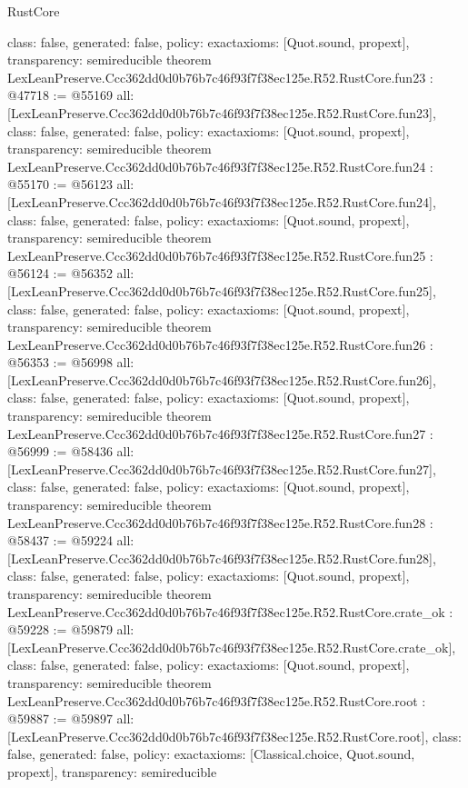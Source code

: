 \begin{lexlean}{RustCore}
\begin{coremodule}
{  class: false,
  generated: false,
  policy: exact{axioms: [Quot.sound, propext]},
  transparency: semireducible
}
theorem LexLeanPreserve.Ccc362dd0d0b76b7c46f93f7f38ec125e.R52.RustCore.fun23 : @47718 := @55169 {
  all: [LexLeanPreserve.Ccc362dd0d0b76b7c46f93f7f38ec125e.R52.RustCore.fun23],
  class: false,
  generated: false,
  policy: exact{axioms: [Quot.sound, propext]},
  transparency: semireducible
}
theorem LexLeanPreserve.Ccc362dd0d0b76b7c46f93f7f38ec125e.R52.RustCore.fun24 : @55170 := @56123 {
  all: [LexLeanPreserve.Ccc362dd0d0b76b7c46f93f7f38ec125e.R52.RustCore.fun24],
  class: false,
  generated: false,
  policy: exact{axioms: [Quot.sound, propext]},
  transparency: semireducible
}
theorem LexLeanPreserve.Ccc362dd0d0b76b7c46f93f7f38ec125e.R52.RustCore.fun25 : @56124 := @56352 {
  all: [LexLeanPreserve.Ccc362dd0d0b76b7c46f93f7f38ec125e.R52.RustCore.fun25],
  class: false,
  generated: false,
  policy: exact{axioms: [Quot.sound, propext]},
  transparency: semireducible
}
theorem LexLeanPreserve.Ccc362dd0d0b76b7c46f93f7f38ec125e.R52.RustCore.fun26 : @56353 := @56998 {
  all: [LexLeanPreserve.Ccc362dd0d0b76b7c46f93f7f38ec125e.R52.RustCore.fun26],
  class: false,
  generated: false,
  policy: exact{axioms: [Quot.sound, propext]},
  transparency: semireducible
}
theorem LexLeanPreserve.Ccc362dd0d0b76b7c46f93f7f38ec125e.R52.RustCore.fun27 : @56999 := @58436 {
  all: [LexLeanPreserve.Ccc362dd0d0b76b7c46f93f7f38ec125e.R52.RustCore.fun27],
  class: false,
  generated: false,
  policy: exact{axioms: [Quot.sound, propext]},
  transparency: semireducible
}
theorem LexLeanPreserve.Ccc362dd0d0b76b7c46f93f7f38ec125e.R52.RustCore.fun28 : @58437 := @59224 {
  all: [LexLeanPreserve.Ccc362dd0d0b76b7c46f93f7f38ec125e.R52.RustCore.fun28],
  class: false,
  generated: false,
  policy: exact{axioms: [Quot.sound, propext]},
  transparency: semireducible
}
theorem LexLeanPreserve.Ccc362dd0d0b76b7c46f93f7f38ec125e.R52.RustCore.crate_ok : @59228 := @59879 {
  all: [LexLeanPreserve.Ccc362dd0d0b76b7c46f93f7f38ec125e.R52.RustCore.crate_ok],
  class: false,
  generated: false,
  policy: exact{axioms: [Quot.sound, propext]},
  transparency: semireducible
}
theorem LexLeanPreserve.Ccc362dd0d0b76b7c46f93f7f38ec125e.R52.RustCore.root : @59887 := @59897 {
  all: [LexLeanPreserve.Ccc362dd0d0b76b7c46f93f7f38ec125e.R52.RustCore.root],
  class: false,
  generated: false,
  policy: exact{axioms: [Classical.choice, Quot.sound, propext]},
  transparency: semireducible
}


\end{coremodule}
\end{lexlean}
